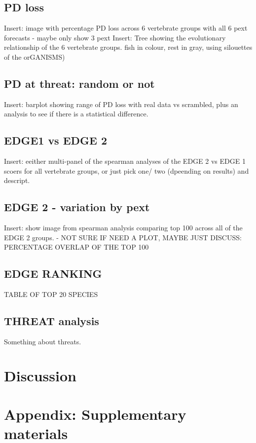 \documentclass[11pt]{article}
\begin{document}
\subsection{PD loss}

Insert: image with percentage PD loss across 6 vertebrate groups with all 6 
pext forecasts
- maybe only show 3 pext 
Insert: Tree showing the evolutionary relationship of the 6 vertebrate groups.
fish in colour, rest in gray, using silouettes of the orGANISMS) 

\subsection{PD at threat: random or not}
Insert: barplot showing range of PD loss with real data vs scrambled, plus an 
analysis to see if there is a statistical difference. 

\subsection{EDGE1 vs EDGE 2}
Insert: eeither multi-panel of the spearman analyses of the EDGE 2 vs EDGE 1 
scoers for all vertebrate groups, or just pick one/ two (dpeending on results) 
and descript. 

\subsection{EDGE 2 - variation by pext}
Insert: show image from spearman analysis comparing top 100 across all of the 
EDGE 2 groups. 
- NOT SURE IF NEED A PLOT, MAYBE JUST DISCUSS: PERCENTAGE OVERLAP OF THE TOP 100


\subsection{EDGE RANKING}
TABLE OF TOP 20 SPECIES 




\subsection{THREAT analysis}
Something about threats. 



\section{Discussion}
\noindent



\noindent
\printbibliography 


\section{Appendix: Supplementary materials}

	
\end{document}
